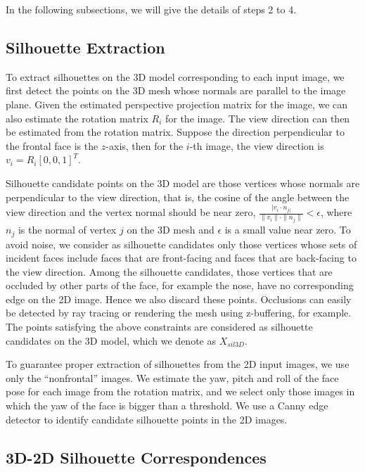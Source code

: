In the following subsections, we will give the details of steps 2 to 4.

\subsection{Silhouette Extraction}

To extract silhouettes on the 3D model corresponding to each input image, we first detect the points on the 3D mesh whose normals are parallel to the image plane. Given the estimated perspective projection matrix for the image, we can also estimate the rotation matrix $R_{i}$ for the image. The view direction can then be estimated from the rotation matrix. Suppose the direction perpendicular to the frontal face is the $z$-axis, then for the $i$-th image, the view direction is $v_{i}=R_{i} \left[ 0,  0,  1 \right]^T$. 

Silhouette candidate points on the 3D model are those vertices whose normals are perpendicular to the view direction, that is, the cosine of the angle between the view direction and the vertex normal should be near zero, $\frac {|v_{i} \cdot n_{j|}} {\|v_{i} \| \cdot \|n_{j} \|} < \epsilon$, where $n_{j}$ is the normal of vertex $j$ on the 3D mesh and $\epsilon$ is a small value near zero. To avoid noise, we consider as silhouette candidates only those vertices whose sets of incident faces include faces that are front-facing and faces that are back-facing to the view direction. Among the silhouette candidates, those vertices that are occluded by other parts of the face, for example the nose, have no corresponding edge on the 2D image. Hence we also discard these points. Occlusions can easily be detected by ray tracing or rendering the mesh using z-buffering, for example. The points satisfying the above constraints are considered as silhouette candidates on the 3D model, which we denote as $X_{sil3D}$.

To guarantee proper extraction of silhouettes from the 2D input images, we use only the ``nonfrontal'' images. We estimate the yaw, pitch and roll of the face pose for each image from the rotation matrix, and we select only those images in which the yaw of the face is bigger than a threshold. We use a Canny edge detector \cite{Canny86} to identify candidate silhouette points in the 2D images.


\subsection{3D-2D Silhouette Correspondences}
\label{sec:correspondences}

